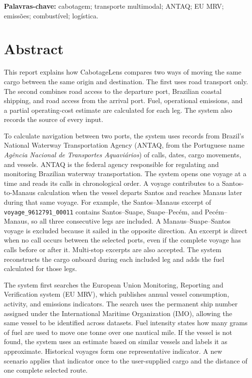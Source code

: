 \documentclass[12pt,a4paper]{report}
\begin{document}
\noindent\textbf{Palavras-chave:} cabotagem; transporte multimodal; ANTAQ; EU MRV; emissões; combustível; logística.

\chapter*{Abstract}
This report explains how CabotageLens compares two ways of moving the same cargo between the same origin and destination. The first uses road transport only. The second combines road access to the departure port, Brazilian coastal shipping, and road access from the arrival port. Fuel, operational emissions, and a partial operating-cost estimate are calculated for each leg. The system also records the source of every input.

To calculate navigation between two ports, the system uses records from Brazil's National Waterway Transportation Agency (ANTAQ, from the Portuguese name \emph{Agência Nacional de Transportes Aquaviários}) of calls, dates, cargo movements, and vessels. ANTAQ is the federal agency responsible for regulating and monitoring Brazilian waterway transportation. The system opens one voyage at a time and reads its calls in chronological order. A voyage contributes to a Santos-to-Manaus calculation when the vessel departs Santos and reaches Manaus later during that same voyage. For example, the Santos--Manaus excerpt of \texttt{voyage\_9612791\_00011} contains Santos--Suape, Suape--Pecém, and Pecém--Manaus, so all three consecutive legs are included. A Manaus--Suape--Santos voyage is excluded because it sailed in the opposite direction. An excerpt is direct when no call occurs between the selected ports, even if the complete voyage has calls before or after it. Multi-stop excerpts are also accepted. The system reconstructs the cargo onboard during each included leg and adds the fuel calculated for those legs.

The system first searches the European Union Monitoring, Reporting and Verification system (EU MRV), which publishes annual vessel consumption, activity, and emissions indicators. The search uses the permanent ship number assigned under the International Maritime Organization (IMO), allowing the same vessel to be identified across datasets. Fuel intensity states how many grams of fuel are used to move one tonne over one nautical mile. If the vessel is not found, the system uses an estimate based on similar vessels and labels it as approximate. Historical voyages form one representative indicator. A new scenario applies that indicator once to the user-supplied cargo and the distance of one complete selected route.
\end{document}

